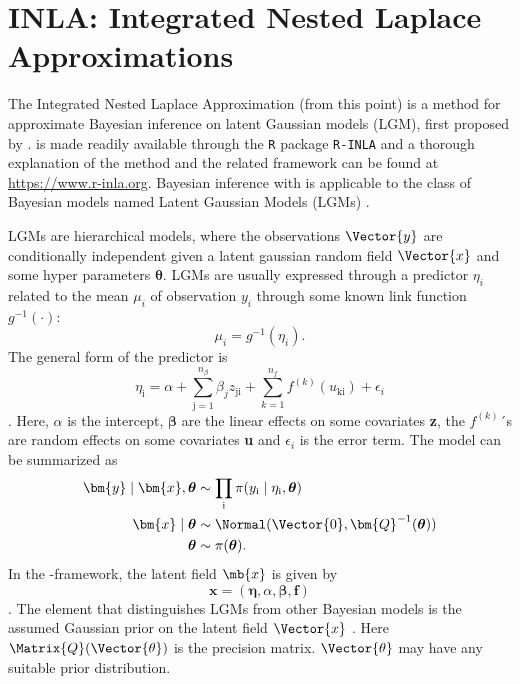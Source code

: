 \newpage
\section{INLA: Integrated Nested Laplace Approximations}
The Integrated Nested Laplace Approximation (\inla from this point) is a method for approximate Bayesian inference on latent Gaussian models (LGM), first proposed by \textcite{rue2009inla}. \inla is made readily available through the \texttt{R} package \texttt{R-INLA} and a thorough explanation of the method and the related framework can be found at \url{https://www.r-inla.org}. 
Bayesian inference with \inla is applicable to the class of Bayesian models named Latent Gaussian Models (LGMs) \parencite{rue2009inla}.  

\newpar LGMs are hierarchical models, where the observations $\Vector{y}$ are conditionally independent given a latent gaussian random field $\Vector{x}$ and some hyper parameters $\boldsymbol{\theta}$.
LGMs are usually expressed through a predictor $\eta_i$ related to the mean $\mu_i$ of observation $y_i$ through some known link function $g^{-1}(\cdot)$:
\begin{equation}
    \mu_i = g^{-1}(\eta_i).
    \label{eq:LGMlinkFunction}
\end{equation}
The general form of the predictor is
\begin{equation}
    \eta_\text{i} = \alpha + \sum_{\text{j}=1}^{n_{\beta}}\beta_j z_{\text{ji}} + \sum_{k=1}^{n_f}f^{(k)}(u_{\text{ki}}) + \epsilon_{i}
    \label{LGM-linear-predictor}
\end{equation}
\parencite{rue2009inla}. Here, $\alpha$ is the intercept, $\boldsymbol{\beta}$ are the linear effects on some covariates \textbf{z}, the $f^{(k)}$´s are random effects on some covariates \textbf{u} and $\epsilon_i$ is the error term. The model can be summarized as 
\begin{equation}
    \begin{aligned}
    \bm{y}\mid \bm{x}, \boldsymbol{\theta} &\sim \prod_{\text{i}} \pi (y_{\text{i}} \mid \eta_{\text{i}}, \boldsymbol{\theta})\\
    \bm{x} \mid \boldsymbol{\theta} &\sim \Normal(\Vector{0}, \bm{Q}^{-1}(\boldsymbol{\theta})) \\
    \boldsymbol{\theta} &\sim \pi(\boldsymbol{\theta}).
    \end{aligned}
    \label{LGM-model-summarized}
\end{equation}
In the \inla-framework, the latent field $\mb{x}$ is given by
\begin{equation}
    \bm{x} = (\boldsymbol{\eta}, \alpha, \boldsymbol{\beta}, \boldsymbol{f})
    \label{LGM-latent-field}
\end{equation}
\parencite{martinoRiebler2019}. The element that distinguishes LGMs from other Bayesian models is the assumed Gaussian prior on the latent field $\Vector{x}$ \parencite{rue2009inla}. Here $\Matrix{Q}(\Vector{\theta})$ is the precision matrix. $\Vector{\theta}$ may have any suitable prior distribution. 

